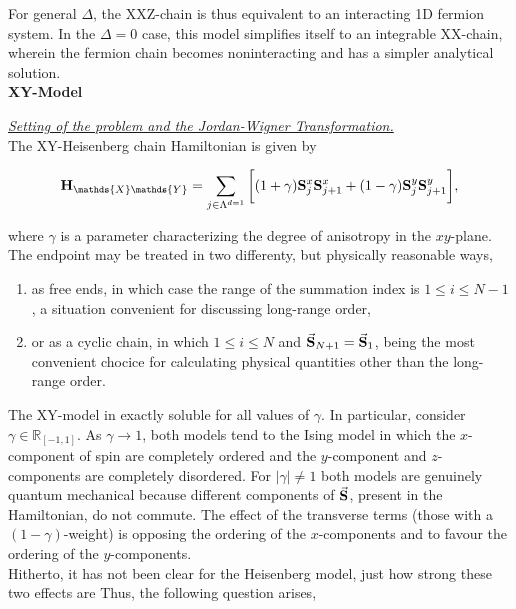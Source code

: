 \documentclass{homework}
\begin{document}
For general $\Delta$, the XXZ-chain is thus equivalent to an interacting 1D fermion system. In the $\Delta = 0$ case, this model simplifies itself to an integrable XX-chain, wherein the fermion chain becomes noninteracting and has a simpler analytical solution. \\

\textbf{XY-Model}

\textit{\underline{Setting of the problem and the Jordan-Wigner Transformation.}} \\

The XY-Heisenberg chain Hamiltonian is given by 

\begin{equation}
    {\bf H}_{\mathds{X}\mathds{Y}} = \sum_{j \in \Lambda^{d=1}} \bigg[(1+\gamma) \spin_{j}^x\spin_{j+1}^x + (1-\gamma) \spin_{j}^y\spin_{j+1}^y \bigg],
\end{equation}

where $\gamma$ is a parameter characterizing the degree of anisotropy in the $xy$-plane. The endpoint may be treated in two differenty, but physically reasonable ways, 

\begin{enumerate}
    \item as free ends, in which case the range of the summation index is $1 \leq i \leq N-1$, a situation convenient for discussing long-range order, 
    \item or as a cyclic chain, in which $1 \leq i \leq N$ and $\vec{{\bf S}}_{N+1} = \vec{{\bf S}}_1$, being the most convenient chocice for calculating physical quantities other than the long-range order. \\
\end{enumerate}

The XY-model in exactly soluble for all values of $\gamma$. In particular, consider $\gamma \in \mathds{R}_{[-1,1]}$. As $\gamma \rightarrow 1$, both models tend to the Ising model in which the $x$-component of spin are completely ordered and the $y$-component and $z$-components are completely disordered. For $|\gamma| \neq 1$ both models are genuinely quantum mechanical because different components of $\vec{{\bf S}}$, present in the Hamiltonian, do not commute. The effect of the transverse terms (those with a $(1-\gamma)$-weight) is opposing the ordering of the $x$-components and to favour the ordering of the $y$-components. \\

Hitherto, it has not been clear for the Heisenberg model, just how strong these two effects are  Thus, the following question arises,
\end{document}
